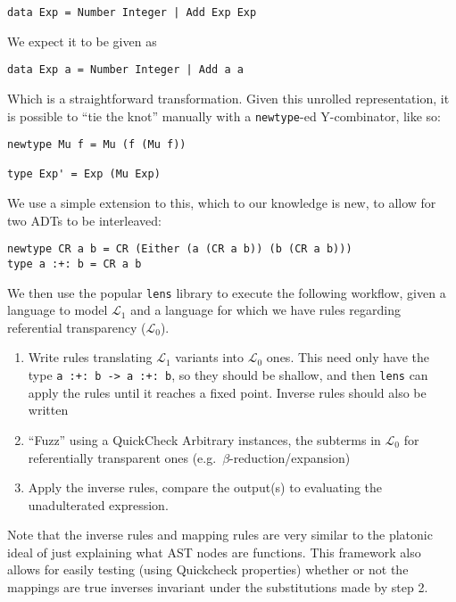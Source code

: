 \documentclass[12pt]{article}
\renewcommand{\L}{\mathcal{L}}
\begin{document}
\begin{verbatim}
data Exp = Number Integer | Add Exp Exp
\end{verbatim}

We expect it to be given as
\begin{verbatim}
data Exp a = Number Integer | Add a a
\end{verbatim}

Which is a straightforward transformation. Given this unrolled representation,
it is possible to ``tie the knot'' manually with a \texttt{newtype}-ed
Y-combinator, like so:
\begin{verbatim}
newtype Mu f = Mu (f (Mu f))

type Exp' = Exp (Mu Exp)
\end{verbatim}

We use a simple extension to this, which to our knowledge is new, to allow for
two ADTs to be interleaved:

\begin{verbatim}
newtype CR a b = CR (Either (a (CR a b)) (b (CR a b)))
type a :+: b = CR a b
\end{verbatim}

We then use the popular \texttt{lens} library to execute the following workflow,
given a language to model $\L_1$ and a language for which we have rules
regarding referential transparency ($\L_0$).

\begin{enumerate}[(1)]
\item Write rules translating $\L_1$ variants into $\L_0$ ones. This need only
  have the type \texttt{a :+: b -> a :+: b}, so they should be shallow, and then
  \texttt{lens} can apply the rules until it reaches a fixed point. Inverse
  rules should also be written
  
\item ``Fuzz'' using a QuickCheck Arbitrary instances, the subterms in $\L_0$
  for referentially transparent ones (e.g.~$\beta$-reduction/expansion)
  
\item Apply the inverse rules, compare the output(s) to evaluating the
  unadulterated expression.
\end{enumerate}

Note that the inverse rules and mapping rules are very similar to the platonic
ideal of just explaining what AST nodes are functions. This framework also
allows for easily testing (using Quickcheck properties) whether or not the
mappings are true inverses invariant under the substitutions made by step 2.
\end{document}
